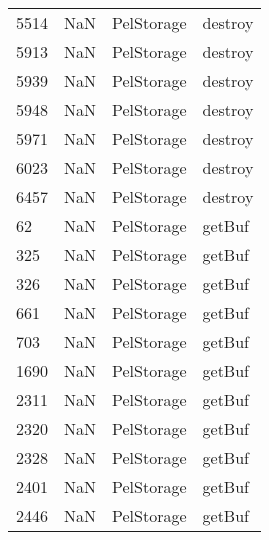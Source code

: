 \begin{tabular}{llll}
5514 &                   NaN &                 PelStorage &                                   destroy \\
5913 &                   NaN &                 PelStorage &                                   destroy \\
5939 &                   NaN &                 PelStorage &                                   destroy \\
5948 &                   NaN &                 PelStorage &                                   destroy \\
5971 &                   NaN &                 PelStorage &                                   destroy \\
6023 &                   NaN &                 PelStorage &                                   destroy \\
6457 &                   NaN &                 PelStorage &                                   destroy \\
62   &                   NaN &                 PelStorage &                                    getBuf \\
325  &                   NaN &                 PelStorage &                                    getBuf \\
326  &                   NaN &                 PelStorage &                                    getBuf \\
661  &                   NaN &                 PelStorage &                                    getBuf \\
703  &                   NaN &                 PelStorage &                                    getBuf \\
1690 &                   NaN &                 PelStorage &                                    getBuf \\
2311 &                   NaN &                 PelStorage &                                    getBuf \\
2320 &                   NaN &                 PelStorage &                                    getBuf \\
2328 &                   NaN &                 PelStorage &                                    getBuf \\
2401 &                   NaN &                 PelStorage &                                    getBuf \\
2446 &                   NaN &                 PelStorage &                                    getBuf \\

\end{tabular}
